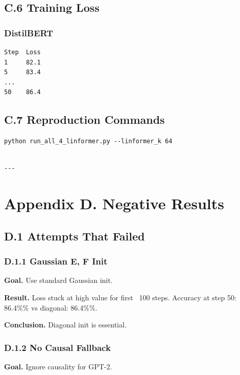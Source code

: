 \subsection{C.6 Training Loss}

\subsubsection{DistilBERT}
\begin{lstlisting}
Step  Loss
1     82.1
5     83.4
...
50    86.4
\end{lstlisting}

\subsection{C.7 Reproduction Commands}

\begin{lstlisting}
python run_all_4_linformer.py --linformer_k 64
\end{lstlisting}
\begin{lstlisting}

---
\end{lstlisting}

\section{Appendix D. Negative Results}

\subsection{D.1 Attempts That Failed}

\subsubsection{D.1.1 Gaussian E, F Init}

\textbf{Goal.} Use standard Gaussian init.

\textbf{Result.} Loss stuck at high value for first ~100 steps. Accuracy at 
step 50: 86.4\%\% vs diagonal: 86.4\%\%.

\textbf{Conclusion.} Diagonal init is essential.

\subsubsection{D.1.2 No Causal Fallback}

\textbf{Goal.} Ignore causality for GPT-2.

